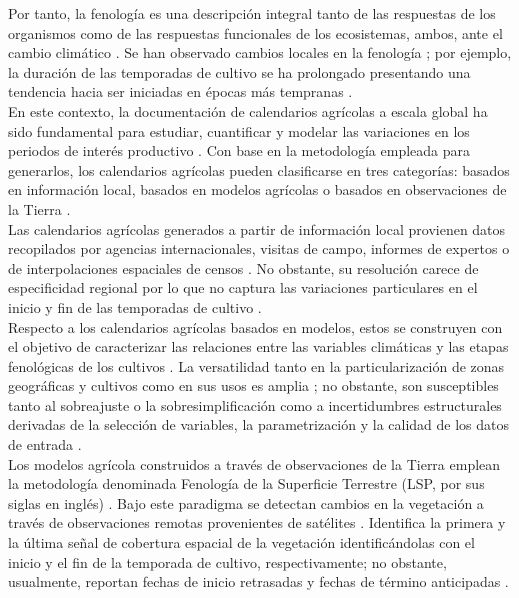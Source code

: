 Por tanto, la fenología es una descripción integral tanto de las respuestas de los organismos como de las respuestas funcionales de los ecosistemas, ambos, ante el cambio climático \cite{RICHARDSON_2013,RICHARDSON_2023}. Se han observado cambios locales en la fenología \cite{CLELAND_2007}; por ejemplo, la duración de las temporadas de cultivo se ha prolongado presentando una tendencia hacia ser iniciadas en épocas más tempranas \cite{ LINDERHOLM_2006}.\\

En este contexto, la documentación de calendarios agrícolas a escala global ha sido fundamental para estudiar, cuantificar y modelar las variaciones en los periodos de interés productivo \cite{Jgermeyr_2018}. Con base en la metodología empleada para generarlos, los calendarios agrícolas pueden clasificarse en tres categorías: basados en información local, basados en modelos agrícolas o basados en observaciones de la Tierra \cite{Franch_2022}.\\ 

Las calendarios agrícolas generados a partir de información local provienen datos recopilados por agencias internacionales, visitas de campo, informes de expertos o de interpolaciones espaciales de censos \cite{Franch_2022}. No obstante, su resolución carece de especificidad regional por lo que no captura las variaciones particulares en el inicio y fin de las temporadas de cultivo \cite{Whitcraft_2015}.\\


Respecto a los calendarios agrícolas basados en modelos, estos se construyen con el objetivo de caracterizar las relaciones entre las variables climáticas y las etapas fenológicas de los cultivos \cite{Franch_2022}. La versatilidad tanto en la particularización de zonas geográficas y cultivos como en sus usos es amplia \cite{Mo_2023, Wu_2017}; no obstante, son susceptibles tanto al sobreajuste o la sobresimplificación como a incertidumbres estructurales derivadas de la selección de variables, la parametrización y la calidad de los datos de entrada \cite{Olesen_2007}.\\ 

Los modelos agrícola construidos a través de observaciones de la Tierra emplean la metodología denominada Fenología de la Superficie Terrestre (LSP, por sus siglas en inglés) \cite{Franch_2022}. Bajo este paradigma se detectan cambios en la vegetación a través de observaciones remotas provenientes de satélites \cite{Kimball_2014}. Identifica la primera y la última señal de cobertura espacial de la vegetación identificándolas con el inicio y el fin de la temporada de cultivo, respectivamente; no obstante, usualmente, reportan fechas de inicio retrasadas y fechas de término anticipadas \cite{Franch_2022}.\\ 


